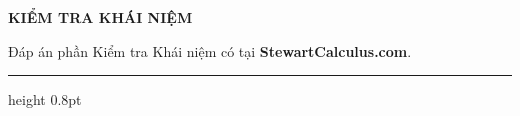 \noindent
\begingroup
\setlength{\fboxsep}{0pt}%
\colorbox{stewartlightblue}{%
}%
\endgroup

\vspace{8pt}

\noindent
\begin{minipage}[b]{0.45\textwidth}
    {\bfseries\large\textsf{\color{stewartcyan}KIỂM TRA KHÁI NIỆM}}
\end{minipage}%
\hfill
\begin{minipage}[b]{0.53\textwidth}
    \raggedleft
    {\footnotesize\textsf{\color{stewartgray}Đáp án phần Kiểm tra Khái niệm có tại \textbf{StewartCalculus.com}.}}
\end{minipage}

\vspace{2pt}
{\color{stewartcyan}\hrule height 0.8pt}
\vspace{5pt}


